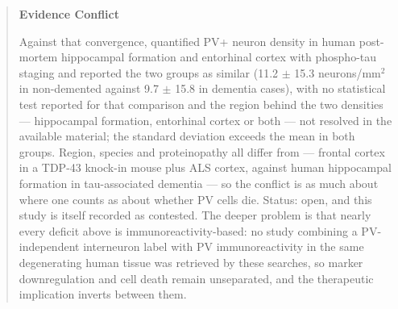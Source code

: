 \documentclass[11pt]{article}
\begin{document}
\begin{quote}
\noindent\textbf{Evidence Conflict}\par
Against that convergence, \citet{MerinoSerrais2025} quantified PV+ neuron density in human post-mortem hippocampal formation and entorhinal cortex with phospho-tau staging and reported the two groups as similar (11.2 $\pm$ 15.3 neurons/mm$^{2}$ in non-demented against 9.7 $\pm$ 15.8 in dementia cases), with no statistical test reported for that comparison and the region behind the two densities --- hippocampal formation, entorhinal cortex or both --- not resolved in the available material; the standard deviation exceeds the mean in both groups. Region, species and proteinopathy all differ from \citet{Lin2021} --- frontal cortex in a TDP-43 knock-in mouse plus ALS cortex, against human hippocampal formation in tau-associated dementia --- so the conflict is as much about where one counts as about whether PV cells die. Status: open, and this study is itself recorded as contested. The deeper problem is that nearly every deficit above is immunoreactivity-based: no study combining a PV-independent interneuron label with PV immunoreactivity in the same degenerating human tissue was retrieved by these searches, so marker downregulation and cell death remain unseparated, and the therapeutic implication inverts between them.

\end{quote}
\end{document}
